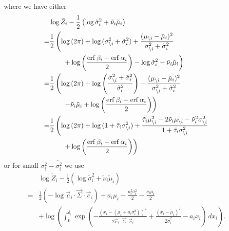 \documentclass[11pt,twoside]{report}
\begin{document}
where we have either
\begin{align}
  & \log{\tilde{Z}_i}
  - \frac{1}{2}
  \left(
  \log{\tilde{\sigma}_i^2}
  + \tilde{\nu}_i \tilde{\mu}_i
  \right)
  \nonumber \\ =&
  \frac{1}{2} \left(
  \log{(2\pi)} +
  \log{(\sigma_{\setminus i}^2 + \tilde{\sigma}_i^2)} +
  \frac{(\mu_{\setminus i} - \tilde{\mu}_i)^2}{\sigma_{\setminus i}^2 + \tilde{\sigma}_i^2}
  \right.
  \nonumber \\ & \qquad
  \left.
  + \log{\left(\frac{\operatorname{erf}{\beta_i} - \operatorname{erf}{\alpha_i}}{2}\right)}
  - \log{\tilde{\sigma}_i^2}
  - \tilde{\nu}_i \tilde{\mu}_i
  \right)
  \nonumber \\ =&
  \frac{1}{2} \left(
  \log{(2\pi)} +
  \log{\left(\frac{\sigma_{\setminus i}^2 + \tilde{\sigma}_i^2}{\tilde{\sigma}_i^2}\right)}
  + \frac{(\mu_{\setminus i} - \tilde{\mu}_i)^2}{\sigma_{\setminus i}^2 + \tilde{\sigma}_i^2}
  \right.
  \nonumber \\ & \qquad
  \left.
  - \tilde{\nu}_i \tilde{\mu}_i
  + \log{\left(\frac{\operatorname{erf}{\beta_i} - \operatorname{erf}{\alpha_i}}{2}\right)}
  \right)
  \nonumber \\ =&
  \frac{1}{2} \left(
  \log{(2\pi)} +
  \log{(1 + \tilde{\tau}_i \sigma_{\setminus i}^2)}
  + \frac{\tilde{\tau}_i \mu_{\setminus i}^2 - 2\tilde{\nu}_i \mu_{\setminus i} - \tilde{\nu}_i^2 \sigma_{\setminus i}^2}
  {1 + \tilde{\tau}_i \sigma_{\setminus i}^2}
  \right.
  \nonumber \\ & \qquad
  \left.
  + \log{\left(\frac{\operatorname{erf}{\beta_i} - \operatorname{erf}{\alpha_i}}{2}\right)}
  \right)
\end{align}
or for small $\sigma_i^2 - \tilde{\sigma_i^2}$ we use
\begin{equation}
  \begin{split}
    &
    \log{\tilde{Z}_i}
    - \frac{1}{2}
    \left(
    \log{\tilde{\sigma}_i^2}
    + \tilde{\nu}_i \tilde{\mu}_i
    \right)
    \\ =&
    \frac{1}{2} \left( -\log{\vec{c}_i \cdot \vec{\Sigma} \cdot \vec{c}_i} \right)
    + a_i \mu_i
    - \frac{a_i^2 \sigma_i^2}{2}
    - \frac{\tilde{\nu}_i \tilde{\mu}_i}{2}
    \\ & + 
    \log{\left(
      \int_0^{\delta_i}
      \exp{\left( -\frac{(x_i - (\mu_i + a_i \sigma_i^2))^2}{2 \vec{c}_i \cdot \vec{\Sigma} \cdot \vec{c}_i} +
        \frac{(x_i - \tilde{\mu}_i)^2}{2 \tilde{\sigma}_i^2} -a_i x_i \right)} \, dx_i
      \right)}.
  \end{split}
\end{equation}
\end{document}
